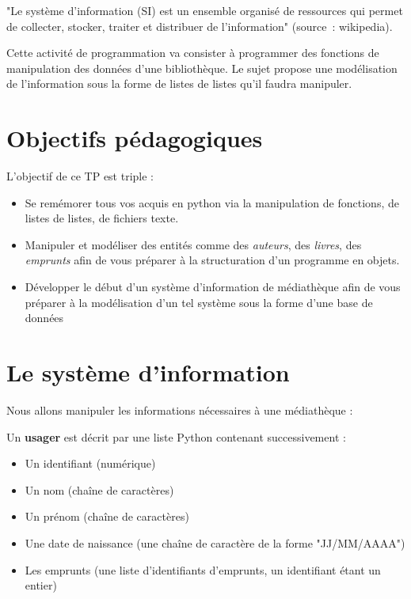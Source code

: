 \documentclass[10pt,a4paper]{sujets-exercices}
\begin{document}

"Le système d'information (SI) est un ensemble organisé de ressources qui permet de collecter, stocker, traiter et distribuer de l'information" (source~: wikipedia).

Cette activité de programmation va consister à programmer des fonctions de manipulation des données d'une bibliothèque. Le sujet propose une modélisation de l'information sous la forme de listes de listes qu'il faudra manipuler.

\section{Objectifs pédagogiques}

L'objectif de ce TP est triple :

\begin{itemize}
\item Se remémorer tous vos acquis en python via la manipulation de fonctions, de listes de listes, de fichiers texte.
\item Manipuler et modéliser des entités comme des \emph{auteurs}, des \emph{livres}, des \emph{emprunts} afin de vous préparer à la structuration d'un programme en objets.
\item Développer le début d'un système d'information de médiathèque afin de vous préparer à la modélisation d'un tel système sous la forme d'une base de données
\end{itemize}

\section{Le système d'information}

Nous allons manipuler les informations nécessaires à une médiathèque :

Un \textbf{usager} est décrit par une liste Python contenant successivement : 

\begin{itemize}
\item Un identifiant (numérique)
\item Un nom (chaîne de caractères)
\item Un prénom (chaîne de caractères)
\item Une date de naissance (une chaîne de caractère de la forme "JJ/MM/AAAA")
\item Les emprunts (une liste d'identifiants d'emprunts, un identifiant étant un entier)
\end{itemize}
\end{document}
